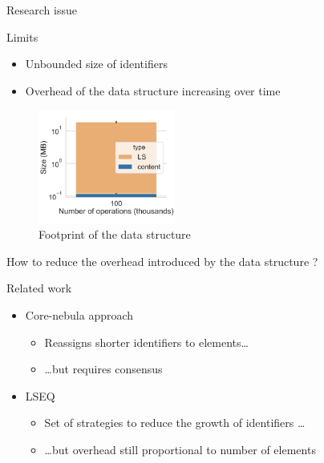 \documentclass[10pt]{beamer}
\begin{document}
\begin{frame}{Research issue}
  \begin{alertblock}{Limits}
    \begin{itemize}
      \item Unbounded size of identifiers
      \item Overhead of the data structure increasing over time
    \end{itemize}
  \end{alertblock}

  \pause

  \begin{figure}
    \centering
    \includegraphics[width=0.4\textwidth]{img/overhead-size.pdf}
    \caption{Footprint of the data structure}
  \end{figure}
\end{frame}




\begin{frame}[standout]
  \alert{How to reduce the overhead introduced by the data structure ?}
\end{frame}

\begin{frame}{Related work}
  \begin{itemize}
    \item Core-nebula approach 
    \begin{itemize}
      \item Reassigns shorter identifiers to elements\dots
      \item \dots but requires consensus
    \end{itemize}
    \item LSEQ 
    \begin{itemize}
      \item Set of strategies to reduce the growth of identifiers \dots
      \item \dots but overhead still proportional to number of elements
    \end{itemize}
  \end{itemize}
\end{frame}
\end{document}

